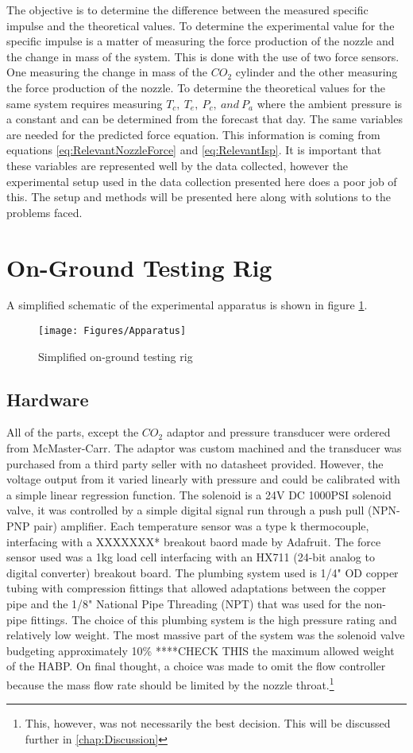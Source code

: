 The objective is to determine the difference between the measured specific impulse and the theoretical values. To determine the experimental value for the specific impulse is a matter of measuring the force production of the nozzle and the change in mass of the system. This is done with the use of two force sensors. One measuring the change in mass of the $CO_2$ cylinder and the other measuring the force production of the nozzle. To determine the theoretical values for the same system requires measuring $T_c,\ T_e,\ P_c,\ and\ P_a$ where the ambient pressure is a constant and can be determined from the forecast that day. The same variables are needed for the predicted force equation. This information is coming from equations \ref{eq:RelevantNozzleForce} and \ref{eq:RelevantIsp}. It is important that these variables are represented well by the data collected, however the experimental setup used in the data collection presented here does a poor job of this. The setup and methods will be presented here along with solutions to the problems faced. 
\section{On-Ground Testing Rig}
A simplified schematic of the experimental apparatus is shown in figure \ref{fig:ApparatusSchem}.
\begin{figure}[h!]
\centering
\texttt{[image: Figures/Apparatus]}
\caption{Simplified on-ground testing rig}
\label{fig:ApparatusSchem}
\end{figure}
\subsection{Hardware}
All of the parts, except the $CO_2$ adaptor and pressure transducer were ordered from McMaster-Carr. The adaptor was custom machined and the transducer was purchased from a third party seller with no datasheet provided. However, the voltage output from it varied linearly with pressure and could be calibrated with a simple linear regression function. The solenoid is a 24V DC 1000PSI solenoid valve, it was controlled by a simple digital signal run through a push pull (NPN-PNP pair) amplifier. Each temperature sensor was a type k thermocouple, interfacing with a XXXXXXX* breakout baord made by Adafruit. The force sensor used was a 1kg load cell interfacing with an HX711 (24-bit analog to digital converter) breakout board. The plumbing system used is 1/4" OD copper tubing with compression fittings that allowed adaptations between the copper pipe and the 1/8" National Pipe Threading (NPT) that was used for the non-pipe fittings. The choice of this plumbing system is the high pressure rating and relatively low weight. The most massive part of the system was the solenoid valve budgeting approximately 10\% ****CHECK THIS the maximum allowed weight of the HABP. On final thought, a choice was made to omit the flow controller because the mass flow rate should be limited by the nozzle throat.\footnote{This, however, was not necessarily the best decision. This will be discussed further in \ref{chap:Discussion}}

